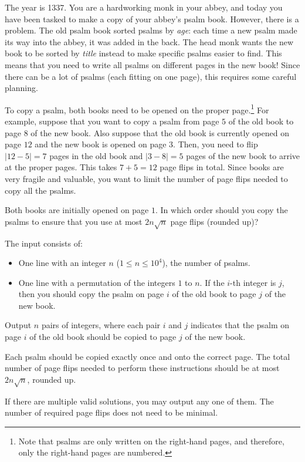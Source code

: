 

\newcommand{\maxn}{10^4}
\newcommand{\maxt}{2n\sqrt{n}}

The year is 1337.
You are a hardworking monk in your abbey, and today you have been tasked to make a copy of your abbey's psalm book.
However, there is a problem. The old psalm book sorted psalms by \emph{age}:
each time a new psalm made its way into the abbey, it was added in the back.
The head monk wants the new book to be sorted by \emph{title} instead to make specific psalms easier to find.
This means that you need to write all psalms on different pages in the new book!
Since there can be a lot of psalms (each fitting on one page), this requires some careful planning.

To copy a psalm, both books need to be opened on the proper page.\footnote{
    Note that psalms are only written on the right-hand pages,
    and therefore, only the right-hand pages are numbered.
}
For example, suppose that you want to copy a psalm from page $5$ of the old book to page $8$ of the new book.
Also suppose that the old book is currently opened on page $12$ and the new book is opened on page $3$.
Then, you need to flip $|12-5| = 7$ pages in the old book and $|3-8| = 5$ pages of the new book to arrive at the proper pages.
This takes $7+5 = 12$ page flips in total.
Since books are very fragile and valuable, you want to limit the number of page flips needed to copy all the psalms.

Both books are initially opened on page $1$.
In which order should you copy the psalms to ensure that you use at most $\maxt$ page flips (rounded up)?

\begin{Input}
    The input consists of:
    \begin{itemize}
        \item One line with an integer $n$ ($1\leq n\leq \maxn$), the number of psalms.
        \item One line with a permutation of the integers $1$ to $n$.
        If the $i$-th integer is $j$,
        then you should copy the psalm on page $i$ of the old book to page $j$ of the new book.
    \end{itemize}
\end{Input}

\begin{Output}
    Output $n$ pairs of integers, where each pair $i$ and $j$ indicates that
    the psalm on page $i$ of the old book should be copied to page $j$ of the new book.

    Each psalm should be copied exactly once and onto the correct page.
    The total number of page flips needed to perform these instructions should be at most $\maxt$, rounded up.

    If there are multiple valid solutions, you may output any one of them.
    The number of required page flips does not need to be minimal.
\end{Output}
